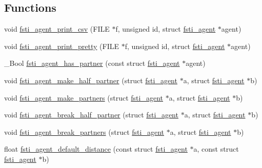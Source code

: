 \subsection*{Functions}
\begin{DoxyCompactItemize}
\item 
void \mbox{\hyperlink{fsti-agent_8h_ad24c55a9a2a07b7a0a07a0fb74be112e}{fsti\+\_\+agent\+\_\+print\+\_\+csv}} (F\+I\+LE $\ast$f, unsigned id, struct \mbox{\hyperlink{structfsti__agent}{fsti\+\_\+agent}} $\ast$agent)
\item 
void \mbox{\hyperlink{fsti-agent_8h_a067437e70d5fe4d1e6f139bab513c6ac}{fsti\+\_\+agent\+\_\+print\+\_\+pretty}} (F\+I\+LE $\ast$f, unsigned id, struct \mbox{\hyperlink{structfsti__agent}{fsti\+\_\+agent}} $\ast$agent)
\item 
\+\_\+\+Bool \mbox{\hyperlink{fsti-agent_8h_ae4a719a71a7f8a2687d05976340b1ffb}{fsti\+\_\+agent\+\_\+has\+\_\+partner}} (const struct \mbox{\hyperlink{structfsti__agent}{fsti\+\_\+agent}} $\ast$agent)
\item 
void \mbox{\hyperlink{fsti-agent_8h_afaf3c076c60db61e182fb1e5a8eabc77}{fsti\+\_\+agent\+\_\+make\+\_\+half\+\_\+partner}} (struct \mbox{\hyperlink{structfsti__agent}{fsti\+\_\+agent}} $\ast$a, struct \mbox{\hyperlink{structfsti__agent}{fsti\+\_\+agent}} $\ast$b)
\item 
void \mbox{\hyperlink{fsti-agent_8h_aab565f3b1fa1cb77b6a83efd3faa72e7}{fsti\+\_\+agent\+\_\+make\+\_\+partners}} (struct \mbox{\hyperlink{structfsti__agent}{fsti\+\_\+agent}} $\ast$a, struct \mbox{\hyperlink{structfsti__agent}{fsti\+\_\+agent}} $\ast$b)
\item 
void \mbox{\hyperlink{fsti-agent_8h_a69108c3779a3689185b833a70f589225}{fsti\+\_\+agent\+\_\+break\+\_\+half\+\_\+partner}} (struct \mbox{\hyperlink{structfsti__agent}{fsti\+\_\+agent}} $\ast$a, struct \mbox{\hyperlink{structfsti__agent}{fsti\+\_\+agent}} $\ast$b)
\item 
void \mbox{\hyperlink{fsti-agent_8h_a66a819f51531e6f89f92addab960ae3a}{fsti\+\_\+agent\+\_\+break\+\_\+partners}} (struct \mbox{\hyperlink{structfsti__agent}{fsti\+\_\+agent}} $\ast$a, struct \mbox{\hyperlink{structfsti__agent}{fsti\+\_\+agent}} $\ast$b)
\item 
float \mbox{\hyperlink{fsti-agent_8h_a0624a840237ec82520be71b241220226}{fsti\+\_\+agent\+\_\+default\+\_\+distance}} (const struct \mbox{\hyperlink{structfsti__agent}{fsti\+\_\+agent}} $\ast$a, const struct \mbox{\hyperlink{structfsti__agent}{fsti\+\_\+agent}} $\ast$b)
\item 

\end{DoxyCompactItemize}
